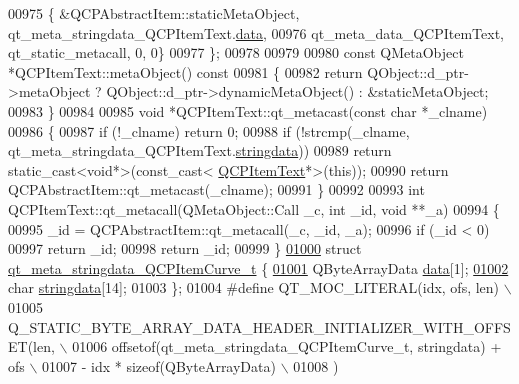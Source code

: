 \begin{DoxyCode}
00975     \{ &QCPAbstractItem::staticMetaObject, qt\_meta\_stringdata\_QCPItemText.\hyperlink{a00067_ae37b5edc1ab54bceebcfba0fb33002ec}{data},
00976       qt\_meta\_data\_QCPItemText,  qt\_static\_metacall, 0, 0\}
00977 \};
00978 
00979 
00980 \textcolor{keyword}{const} QMetaObject *QCPItemText::metaObject()\textcolor{keyword}{ const}
00981 \textcolor{keyword}{}\{
00982     \textcolor{keywordflow}{return} QObject::d\_ptr->metaObject ? QObject::d\_ptr->dynamicMetaObject() : &staticMetaObject;
00983 \}
00984 
00985 \textcolor{keywordtype}{void} *QCPItemText::qt\_metacast(\textcolor{keyword}{const} \textcolor{keywordtype}{char} *\_clname)
00986 \{
00987     \textcolor{keywordflow}{if} (!\_clname) \textcolor{keywordflow}{return} 0;
00988     \textcolor{keywordflow}{if} (!strcmp(\_clname, qt\_meta\_stringdata\_QCPItemText.\hyperlink{a00067_aff2bfa25f79dd85cdbd854d9e51371a9}{stringdata}))
00989         \textcolor{keywordflow}{return} \textcolor{keyword}{static\_cast<}\textcolor{keywordtype}{void}*\textcolor{keyword}{>}(\textcolor{keyword}{const\_cast<} \hyperlink{a00041}{QCPItemText}*\textcolor{keyword}{>}(\textcolor{keyword}{this}));
00990     \textcolor{keywordflow}{return} QCPAbstractItem::qt\_metacast(\_clname);
00991 \}
00992 
00993 \textcolor{keywordtype}{int} QCPItemText::qt\_metacall(QMetaObject::Call \_c, \textcolor{keywordtype}{int} \_id, \textcolor{keywordtype}{void} **\_a)
00994 \{
00995     \_id = QCPAbstractItem::qt\_metacall(\_c, \_id, \_a);
00996     \textcolor{keywordflow}{if} (\_id < 0)
00997         \textcolor{keywordflow}{return} \_id;
00998     \textcolor{keywordflow}{return} \_id;
00999 \}
\hypertarget{a00067_source_l01000}{}\hyperlink{a00067}{01000} \textcolor{keyword}{struct }\hyperlink{a00067_d8/d72/a00199}{qt\_meta\_stringdata\_QCPItemCurve\_t} \{
\hypertarget{a00067_source_l01001}{}\hyperlink{a00067_a0424f9a0b87bc8cefa2966874c4c5667}{01001}     QByteArrayData \hyperlink{a00067_a0424f9a0b87bc8cefa2966874c4c5667}{data}[1];
\hypertarget{a00067_source_l01002}{}\hyperlink{a00067_af1db92bb182f435f88c938cc13a52a2c}{01002}     \textcolor{keywordtype}{char} \hyperlink{a00067_af1db92bb182f435f88c938cc13a52a2c}{stringdata}[14];
01003 \};
01004 \textcolor{preprocessor}{#define QT\_MOC\_LITERAL(idx, ofs, len) \(\backslash\)}
01005 \textcolor{preprocessor}{    Q\_STATIC\_BYTE\_ARRAY\_DATA\_HEADER\_INITIALIZER\_WITH\_OFFSET(len, \(\backslash\)}
01006 \textcolor{preprocessor}{    offsetof(qt\_meta\_stringdata\_QCPItemCurve\_t, stringdata) + ofs \(\backslash\)}
01007 \textcolor{preprocessor}{        - idx * sizeof(QByteArrayData) \(\backslash\)}
01008 \textcolor{preprocessor}{    )}

\end{DoxyCode}
